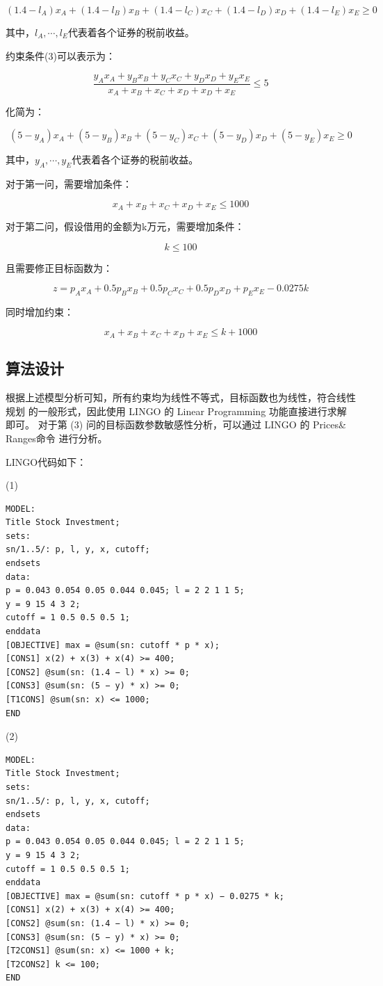 \documentclass{article}
\begin{document}
$$(1.4-l_A)x_A+(1.4-l_B)x_B+(1.4-l_C)x_C+(1.4-l_D)x_D+(1.4-l_E)x_E\geq0$$

其中，$l_A,\cdots,l_E$代表着各个证券的税前收益。

约束条件(3)可以表示为：

$$\frac{y_Ax_A+y_Bx_B+y_Cx_C+y_Dx_D+y_Ex_E}{x_A+x_B+x_C+x_D+x_D+x_E}\leq5$$

化简为：

$$(5-y_A)x_A+(5-y_B)x_B+(5-y_C)x_C+(5-y_D)x_D+(5-y_E)x_E\geq0$$

其中，$y_A,\cdots,y_E$代表着各个证券的税前收益。

对于第一问，需要增加条件：

$$x_A+x_B+x_C+x_D+x_E\leq 1000$$

对于第二问，假设借用的金额为k万元，需要增加条件：

$$k\leq100$$

且需要修正目标函数为：

$$z=p_Ax_A+0.5p_Bx_B+0.5p_Cx_C+0.5p_Dx_D+p_Ex_E-0.0275k$$

同时增加约束：

$$x_A+x_B+x_C+x_D+x_E\leq k+1000$$

\subsection{算法设计}
根据上述模型分析可知，所有约束均为线性不等式，目标函数也为线性，符合线性规划 的一般形式，因此使用 LINGO 的 Linear Programming 功能直接进行求解即可。
对于第 (3) 问的目标函数参数敏感性分析，可以通过 LINGO 的 Prices\& Ranges命令 进行分析。

LINGO代码如下：

(1)
\begin{lstlisting}
MODEL:
Title Stock Investment;
sets:
sn/1..5/: p, l, y, x, cutoff;
endsets
data:
p = 0.043 0.054 0.05 0.044 0.045; l = 2 2 1 1 5;
y = 9 15 4 3 2;
cutoff = 1 0.5 0.5 0.5 1;
enddata
[OBJECTIVE] max = @sum(sn: cutoff * p * x);
[CONS1] x(2) + x(3) + x(4) >= 400;
[CONS2] @sum(sn: (1.4 − l) * x) >= 0;
[CONS3] @sum(sn: (5 − y) * x) >= 0;
[T1CONS] @sum(sn: x) <= 1000;
END
\end{lstlisting}

(2)
\begin{lstlisting}
MODEL:
Title Stock Investment;
sets:
sn/1..5/: p, l, y, x, cutoff;
endsets
data:
p = 0.043 0.054 0.05 0.044 0.045; l = 2 2 1 1 5;
y = 9 15 4 3 2;
cutoff = 1 0.5 0.5 0.5 1;
enddata
[OBJECTIVE] max = @sum(sn: cutoff * p * x) − 0.0275 * k;
[CONS1] x(2) + x(3) + x(4) >= 400;
[CONS2] @sum(sn: (1.4 − l) * x) >= 0;
[CONS3] @sum(sn: (5 − y) * x) >= 0;
[T2CONS1] @sum(sn: x) <= 1000 + k;
[T2CONS2] k <= 100;
END
\end{lstlisting}
\end{document}
